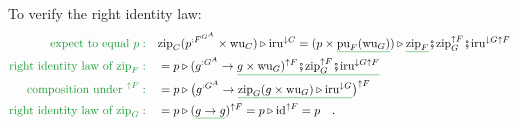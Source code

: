 To verify the right identity law:
\begin{align*}
{\color{greenunder}\text{expect to equal }p:}\quad & \text{zip}_{C}(p^{:F^{G^{A}}}\times\text{wu}_{C})\triangleright\text{iru}^{\downarrow C}=(p\times\gunderline{\text{pu}_{F}(\text{wu}_{G})})\triangleright\gunderline{\text{zip}_{F}}\bef\text{zip}_{G}^{\uparrow F}\bef\text{iru}^{\downarrow G\uparrow F}\\
{\color{greenunder}\text{right identity law of }\text{zip}_{F}:}\quad & =p\triangleright(g^{:G^{A}}\rightarrow\gunderline{g\times\text{wu}_{G})^{\uparrow F}\bef\text{zip}_{G}^{\uparrow F}\bef\text{iru}^{\downarrow G\uparrow F}}\\
{\color{greenunder}\text{composition under }^{\uparrow F}:}\quad & =p\triangleright\big(g^{:G^{A}}\rightarrow\gunderline{\text{zip}_{G}(g\times\text{wu}_{G})\triangleright\text{iru}^{\downarrow G}}\big)^{\uparrow F}\\
{\color{greenunder}\text{right identity law of }\text{zip}_{G}:}\quad & =p\triangleright(\gunderline{g\rightarrow g})^{\uparrow F}=p\triangleright\text{id}^{\uparrow F}=p\quad.
\end{align*}

